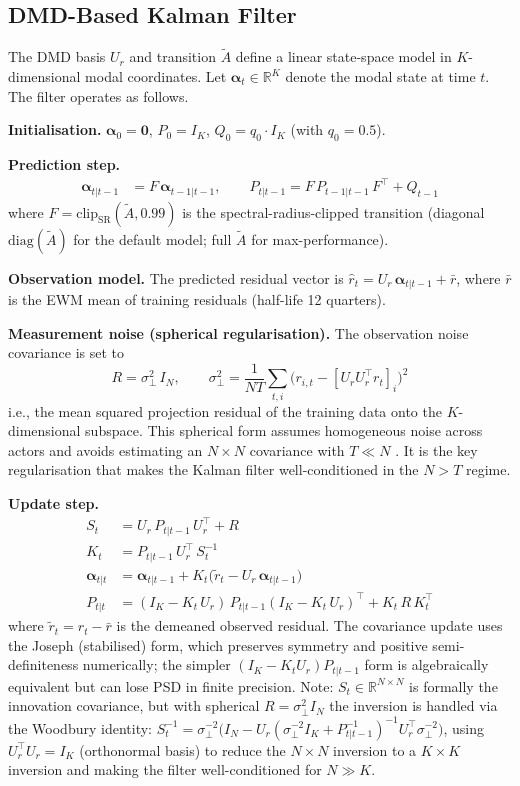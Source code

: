 \documentclass[11pt,a4paper]{article}
\newcommand{\R}{\mathbb{R}}
\newcommand{\diag}{\mathrm{diag}}
\newcommand{\balpha}{\bm{\alpha}}
\newcommand{\clip}{\mathrm{clip}_{\mathrm{SR}}}
\begin{document}
\subsection*{DMD-Based Kalman Filter}

The DMD basis $U_r$ and transition $\tilde{A}$ define a linear state-space model in $K$-dimensional modal coordinates. Let $\balpha_t \in \R^K$ denote the modal state at time $t$. The filter operates as follows.

\textbf{Initialisation.} $\balpha_0 = \mathbf{0}$, $P_0 = I_K$, $Q_0 = q_0 \cdot I_K$ (with $q_0 = 0.5$).

\textbf{Prediction step.}
\begin{align}
\balpha_{t|t-1} &= F \, \balpha_{t-1|t-1}, \qquad
P_{t|t-1} = F \, P_{t-1|t-1} \, F^\top + Q_{t-1}
\end{align}
where $F = \clip(\tilde{A}, 0.99)$ is the spectral-radius-clipped transition (diagonal $\diag(\tilde{A})$ for the default model; full $\tilde{A}$ for max-performance).

\textbf{Observation model.} The predicted residual vector is $\hat{r}_t = U_r \, \balpha_{t|t-1} + \bar{r}$, where $\bar{r}$ is the EWM mean of training residuals (half-life 12 quarters).

\textbf{Measurement noise (spherical regularisation).} The observation noise covariance is set to
\begin{equation}
R = \sigma^2_\perp \, I_N, \qquad \sigma^2_\perp = \frac{1}{NT}\sum_{t,i}\bigl(r_{i,t} - [U_r U_r^\top r_t]_i\bigr)^2
\label{eq:sph_r}
\end{equation}
i.e., the mean squared projection residual of the training data onto the $K$-dimensional subspace. This spherical form assumes homogeneous noise across actors and avoids estimating an $N \times N$ covariance with $T \ll N$ \citep[cf.][]{ledoit2004well}. It is the key regularisation that makes the Kalman filter well-conditioned in the $N > T$ regime.

\textbf{Update step.}
\begin{align}
S_t &= U_r \, P_{t|t-1} \, U_r^\top + R \\
K_t &= P_{t|t-1} \, U_r^\top \, S_t^{-1} \\
\balpha_{t|t} &= \balpha_{t|t-1} + K_t \bigl(\tilde{r}_t - U_r \, \balpha_{t|t-1}\bigr) \\
P_{t|t} &= (I_K - K_t \, U_r) \, P_{t|t-1} (I_K - K_t \, U_r)^\top + K_t \, R \, K_t^\top
\end{align}
where $\tilde{r}_t = r_t - \bar{r}$ is the demeaned observed residual. The covariance update uses the Joseph (stabilised) form, which preserves symmetry and positive semi-definiteness numerically; the simpler $(I_K - K_t U_r) P_{t|t-1}$ form is algebraically equivalent but can lose PSD in finite precision. Note: $S_t \in \R^{N \times N}$ is formally the innovation covariance, but with spherical $R = \sigma^2_\perp I_N$ the inversion is handled via the Woodbury identity: $S_t^{-1} = \sigma^{-2}_\perp \bigl(I_N - U_r (\sigma^{-2}_\perp I_K + P_{t|t-1}^{-1})^{-1} U_r^\top \sigma^{-2}_\perp\bigr)$, using $U_r^\top U_r = I_K$ (orthonormal basis) to reduce the $N \times N$ inversion to a $K \times K$ inversion and making the filter well-conditioned for $N \gg K$.
\end{document}
